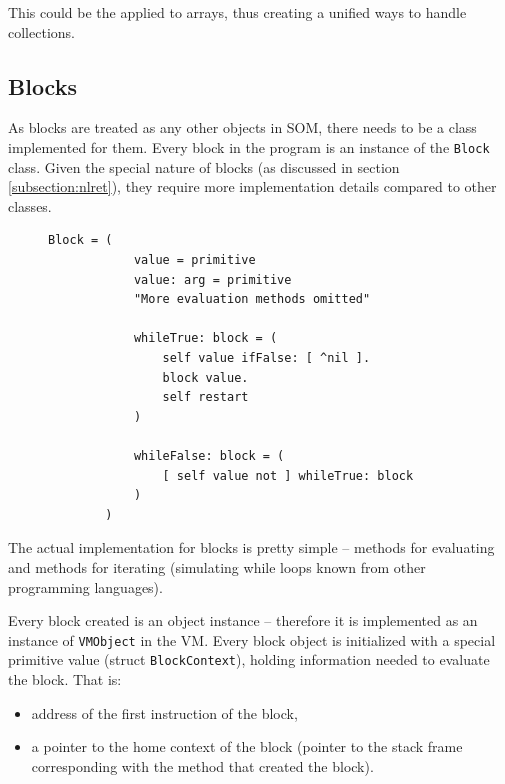 \documentclass[thesis=M,english]{FITthesis}[2019/12/23]
\begin{document}
This could be the applied to arrays, thus creating a unified ways to handle collections.

\subsection{Blocks}
As blocks are treated as any other objects in SOM, there needs to be a class implemented for them. Every block in the program is 
an instance of the \texttt{Block} class. Given the special nature of blocks (as discussed in section \ref{subsection:nlret}), they
require more implementation details compared to other classes.

\begin{figure}[h!]
	\centering
	\begin{lstlisting}[language=Smalltalk]
		Block = (
			value = primitive
			value: arg = primitive
			"More evaluation methods omitted"
			
			whileTrue: block = (
				self value ifFalse: [ ^nil ].
				block value.
				self restart
			)

			whileFalse: block = (
				[ self value not ] whileTrue: block
			)
		)
	\end{lstlisting}
\end{figure}

The actual implementation for blocks is pretty simple -- methods for evaluating and methods for iterating (simulating while loops known from
other programming languages).

Every block created is an object instance -- therefore it is implemented as an instance of \texttt{VMObject} in the VM. Every block object is
initialized with a special primitive value (struct \texttt{BlockContext}), holding information needed to evaluate the block. That is:
\begin{itemize}
	\item address of the first instruction of the block,
	\item a pointer to the home context of the block (pointer to the stack frame corresponding with the method that created the block).
\end{itemize}
\end{document}
